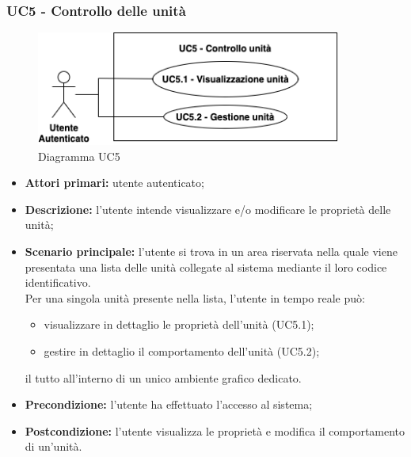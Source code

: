 \subsubsection{UC5 - Controllo delle unità}
\begin{figure}[h!]
    \centering
    \includegraphics[width=10cm]{images/uc5.png}
    \caption{Diagramma UC5}
\end{figure}
\begin{itemize}
    \item \textbf{Attori primari:} utente autenticato;
    \item \textbf{Descrizione:} l'utente intende visualizzare e/o modificare le proprietà delle unità;
    \item \textbf{Scenario principale:} l'utente si trova in un area riservata nella quale viene presentata una lista delle unità collegate al sistema mediante il loro codice identificativo.\\
    Per una singola unità presente nella lista, l'utente in tempo reale può:
    \begin{itemize}
        \item visualizzare in dettaglio le proprietà dell'unità (UC5.1);
        \item gestire in dettaglio il comportamento dell'unità (UC5.2);
    \end{itemize}
    il tutto all'interno di un unico ambiente grafico dedicato.
    \item \textbf{Precondizione:} l'utente ha effettuato l'accesso al sistema;
    \item \textbf{Postcondizione:} l'utente visualizza le proprietà e modifica il comportamento di un'unità.
\end{itemize}

